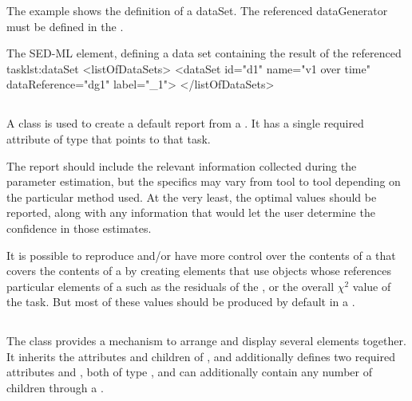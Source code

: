 \begin{blockChanged}
The example shows the definition of a dataSet. The referenced dataGenerator  must be defined in the \hyperref[class:listOfDataGenerators]{}.
\begin{myXmlLst}{The SED-ML  element, defining a data set containing the result of the referenced task}{lst:dataSet}
<listOfDataSets>
	<dataSet id="d1" name="v1 over time" dataReference="dg1" label="_1">
</listOfDataSets>
\end{myXmlLst}

\subsection{}
\label{class:parameterEstimationReport}
A \ParameterEstimationReport class is used to create a default report from a \ParameterEstimationTask.  It has a single required attribute  of type \SIdRef that points to that task.


The report should include the relevant information collected during the parameter estimation, but the specifics may vary from tool to tool depending on the particular method used.  At the very least, the optimal \AdjustableParameter values should be reported, along with any information that would let the user determine the confidence in those estimates.

It is possible to reproduce and/or have more control over the contents of a \Report that covers the contents of a \ParameterEstimationTask by creating \DataGenerator elements that use \DependentVariable objects whose  references particular elements of a \ParameterEstimationTask such as the residuals of the \Objective, or the overall $\chi^2$ value of the task.  But most of these values should be produced by default in a \ParameterEstimationReport.


\subsection{}
\label{class:figure}
\label{class:listOfSubPlots}

The \Figure class provides a mechanism to arrange and display several \Plot elements together.  It inherits the attributes and children of \Output, and additionally defines two required attributes  and , both of type , and can additionally contain any number of \SubPlot children through a \ListOfSubPlots.


\end{blockChanged}
